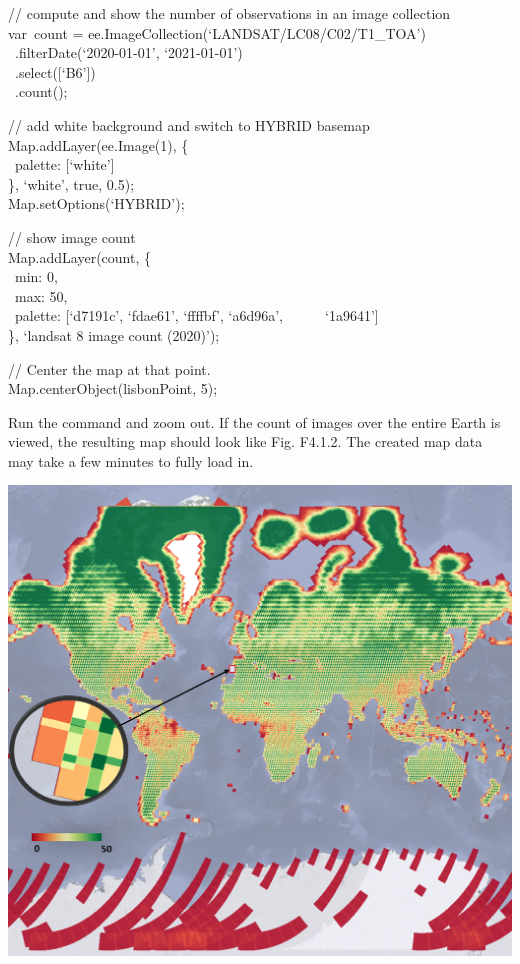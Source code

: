\documentclass[
  letterpaper,
  DIV=11,
  numbers=noendperiod]{scrreprt}
\begin{document}
// compute and show the number of observations in an image collection\\
var~count = ee.ImageCollection(`LANDSAT/LC08/C02/T1\_TOA')\\
\hspace*{0.333em} ~.filterDate(`2020-01-01', `2021-01-01')\\
\hspace*{0.333em} ~.select({[}`B6'{]})\\
\hspace*{0.333em} ~.count();

// add white background and switch to HYBRID basemap\\
Map.addLayer(ee.Image(1), \{\\
\hspace*{0.333em} ~palette: {[}`white'{]}\\
\}, `white', true, 0.5);\\
Map.setOptions(`HYBRID');

// show image count\\
Map.addLayer(count, \{\\
\hspace*{0.333em} ~min: 0,\\
\hspace*{0.333em} ~max: 50,\\
\hspace*{0.333em} ~palette: {[}`d7191c', `fdae61', `ffffbf', `a6d96a',~
~ ~ ~`1a9641'{]}\\
\}, `landsat 8 image count (2020)');

// Center the map at that point.\\
Map.centerObject(lisbonPoint, 5);

Run the command and zoom out. If the count of images over the entire
Earth is viewed, the resulting map should look like Fig. F4.1.2. The
created map data may take a few minutes to fully load in.

\includegraphics{./F4/image27.png}
\end{document}
